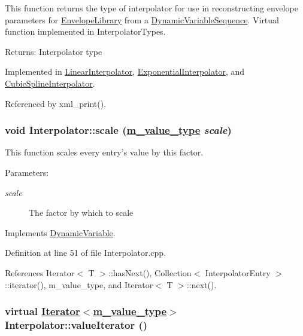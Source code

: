This function returns the type of interpolator for use in reconstructing envelope parameters for \hyperlink{classEnvelopeLibrary}{Envelope\-Library} from a \hyperlink{classDynamicVariableSequence}{Dynamic\-Variable\-Sequence}. Virtual function implemented in Interpolator\-Types. \begin{Desc}
\item[Returns:]Interpolator type \end{Desc}


Implemented in \hyperlink{classLinearInterpolator_a3}{Linear\-Interpolator}, \hyperlink{classExponentialInterpolator_a3}{Exponential\-Interpolator}, and \hyperlink{classCubicSplineInterpolator_a3}{Cubic\-Spline\-Interpolator}.

Referenced by xml\_\-print().\hypertarget{classInterpolator_a4}{
\subsubsection[scale]{\setlength{\rightskip}{0pt plus 5cm}void Interpolator::scale (\hyperlink{Types_8h_a3}{m\_\-value\_\-type} {\em scale})}}
\label{classInterpolator_a4}


This function scales every entry's value by this factor. \begin{Desc}
\item[Parameters:]
\begin{description}
\item[{\em scale}]The factor by which to scale \end{description}
\end{Desc}


Implements \hyperlink{classDynamicVariable_a4}{Dynamic\-Variable}.

Definition at line 51 of file Interpolator.cpp.

References Iterator$<$ T $>$::has\-Next(), Collection$<$ Interpolator\-Entry $>$::iterator(), m\_\-value\_\-type, and Iterator$<$ T $>$::next().\hypertarget{classInterpolator_a3}{
\subsubsection[valueIterator]{\setlength{\rightskip}{0pt plus 5cm}virtual \hyperlink{classIterator}{Iterator}$<$\hyperlink{Types_8h_a3}{m\_\-value\_\-type}$>$ Interpolator::value\-Iterator ()}}
\label{classInterpolator_a3}


